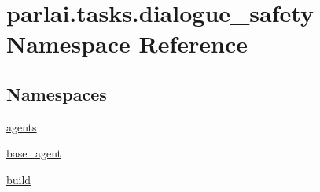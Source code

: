 \hypertarget{namespaceparlai_1_1tasks_1_1dialogue__safety}{}\section{parlai.\+tasks.\+dialogue\+\_\+safety Namespace Reference}
\label{namespaceparlai_1_1tasks_1_1dialogue__safety}
\subsection*{Namespaces}
\begin{DoxyCompactItemize}
\item 
 \hyperlink{namespaceparlai_1_1tasks_1_1dialogue__safety_1_1agents}{agents}
\item 
 \hyperlink{namespaceparlai_1_1tasks_1_1dialogue__safety_1_1base__agent}{base\+\_\+agent}
\item 
 \hyperlink{namespaceparlai_1_1tasks_1_1dialogue__safety_1_1build}{build}
\end{DoxyCompactItemize}
